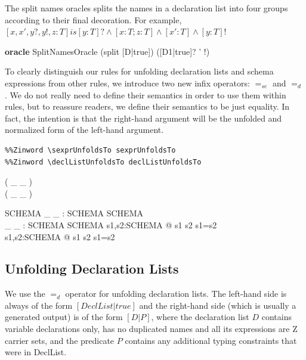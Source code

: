 \documentclass{entcs}
\newenvironment{zedoracle}[1]{\par\textbf{oracle }#1\vspace{-2ex}\infrule}{\endinfrule}
\newcommand{\sexprUnfoldsTo}{\mathrel{=_{se}}}
\newcommand{\declListUnfoldsTo}{\mathrel{=_d}}
\newcommand{\is}{\mathrel{is}}
\begin{document}
The split names oracles splits the names in a declaration list into
four groups according to their final decoration.  For example,
$[x, x', y?, y!, z:T] \is [y:T]? \land [x:T; z:T] \land [x':T]\land [y:T]!$

\begin{zedoracle}{SplitNamesOracle}
  (split [D|true]) \is ([D1|true]? \land [D2|true] \land [D3|true]' \land
                       [D4|true]!)
\end{zedoracle}


To clearly distinguish our rules for unfolding declaration lists and
schema expressions from other rules, we introduce two new infix
operators: $\sexprUnfoldsTo$ and $\declListUnfoldsTo$.  
We do not really need to define their semantics in order to use them within
rules, but to reassure readers, we define their semantics to be just
equality.  In fact, the intention is that the right-hand argument
will be the unfolded and normalized form of the left-hand argument.

\begin{verbatim}
%%Zinword \sexprUnfoldsTo sexprUnfoldsTo
%%Zinword \declListUnfoldsTo declListUnfoldsTo
\end{verbatim}
%
\begin{zed}
  \relation ( \_ \sexprUnfoldsTo \_ ) \\
  \relation ( \_ \declListUnfoldsTo \_ )
\end{zed}
%
\begin{gendef}{SCHEMA}
  \_ \sexprUnfoldsTo \_ : SCHEMA \rel SCHEMA \\
  \_ \declListUnfoldsTo \_ : SCHEMA \rel SCHEMA
\where
  \forall s1,s2:SCHEMA @ s1 \sexprUnfoldsTo s2 \iff s1=s2 \\
  \forall s1,s2:SCHEMA @ s1 \declListUnfoldsTo s2 \iff s1=s2 \\
\end{gendef}


\subsection{Unfolding Declaration Lists}

We use the $\declListUnfoldsTo$ operator for unfolding declaration
lists.  The left-hand side is always of the form $[DeclList|true]$ and
the right-hand side (which is usually a generated output) is of the
form $[D|P]$, where the declaration list $D$ contains variable
declarations only, has no duplicated names and all its expressions are
Z carrier sets, and the predicate $P$ contains any additional typing
constraints that were in DeclList.
\end{document}
